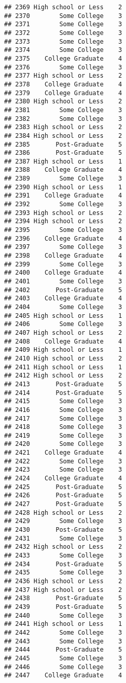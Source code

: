 \documentclass[
]{article}
\begin{document}
\begin{verbatim}
## 2369 High school or Less    2
## 2370        Some College    3
## 2371        Some College    3
## 2372        Some College    3
## 2373        Some College    3
## 2374        Some College    3
## 2375    College Graduate    4
## 2376        Some College    3
## 2377 High school or Less    2
## 2378    College Graduate    4
## 2379    College Graduate    4
## 2380 High school or Less    2
## 2381        Some College    3
## 2382        Some College    3
## 2383 High school or Less    2
## 2384 High school or Less    2
## 2385       Post-Graduate    5
## 2386       Post-Graduate    5
## 2387 High school or Less    1
## 2388    College Graduate    4
## 2389        Some College    3
## 2390 High school or Less    1
## 2391    College Graduate    4
## 2392        Some College    3
## 2393 High school or Less    2
## 2394 High school or Less    2
## 2395        Some College    3
## 2396    College Graduate    4
## 2397        Some College    3
## 2398    College Graduate    4
## 2399        Some College    3
## 2400    College Graduate    4
## 2401        Some College    3
## 2402       Post-Graduate    5
## 2403    College Graduate    4
## 2404        Some College    3
## 2405 High school or Less    1
## 2406        Some College    3
## 2407 High school or Less    2
## 2408    College Graduate    4
## 2409 High school or Less    1
## 2410 High school or Less    2
## 2411 High school or Less    1
## 2412 High school or Less    2
## 2413       Post-Graduate    5
## 2414       Post-Graduate    5
## 2415        Some College    3
## 2416        Some College    3
## 2417        Some College    3
## 2418        Some College    3
## 2419        Some College    3
## 2420        Some College    3
## 2421    College Graduate    4
## 2422        Some College    3
## 2423        Some College    3
## 2424    College Graduate    4
## 2425       Post-Graduate    5
## 2426       Post-Graduate    5
## 2427       Post-Graduate    5
## 2428 High school or Less    2
## 2429        Some College    3
## 2430       Post-Graduate    5
## 2431        Some College    3
## 2432 High school or Less    2
## 2433        Some College    3
## 2434       Post-Graduate    5
## 2435        Some College    3
## 2436 High school or Less    2
## 2437 High school or Less    2
## 2438       Post-Graduate    5
## 2439       Post-Graduate    5
## 2440        Some College    3
## 2441 High school or Less    1
## 2442        Some College    3
## 2443        Some College    3
## 2444       Post-Graduate    5
## 2445        Some College    3
## 2446        Some College    3
## 2447    College Graduate    4

\end{verbatim}
\end{document}
